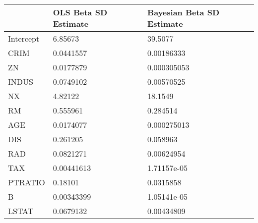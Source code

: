 \begin{tabular}{lll}
\hline
           & OLS Beta SD Estimate   & Bayesian Beta SD Estimate   \\
\hline
 Intercept & 6.85673                & 39.5077                     \\
 CRIM      & 0.0441557              & 0.00186333                  \\
 ZN        & 0.0177879              & 0.000305053                 \\
 INDUS     & 0.0749102              & 0.00570525                  \\
 NX        & 4.82122                & 18.1549                     \\
 RM        & 0.555961               & 0.284514                    \\
 AGE       & 0.0174077              & 0.000275013                 \\
 DIS       & 0.261205               & 0.058963                    \\
 RAD       & 0.0821271              & 0.00624954                  \\
 TAX       & 0.00441613             & 1.71157e-05                 \\
 PTRATIO   & 0.18101                & 0.0315858                   \\
 B         & 0.00343399             & 1.05141e-05                 \\
 LSTAT     & 0.0679132              & 0.00434809                  \\
\hline
\end{tabular}
